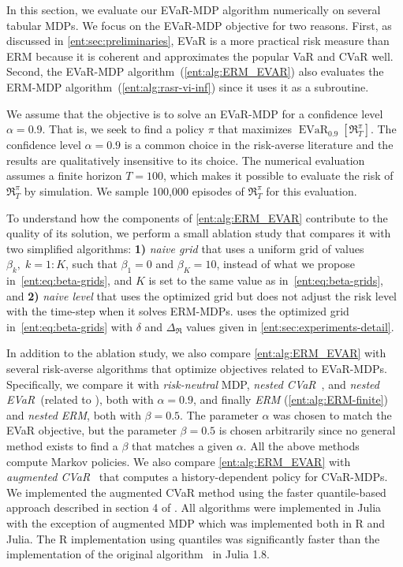 \documentclass[twoside]{article}
\newcommand{\vspan}{\Delta_{\mathfrak{R}}}
\newcommand{\evar}[2]{\operatorname{EVaR}_{#1} \left[#2\right]}
\theoremstyle{plain}
\theoremstyle{definition}
\theoremstyle{remark}
\renewcommand{\cite}[1]{\citep{#1}}
\begin{document}
In this section, we evaluate our EVaR-MDP algorithm numerically on several tabular MDPs. We focus on the EVaR-MDP objective for two reasons. First, as discussed in \cref{ent:sec:preliminaries}, EVaR is a more practical risk measure than ERM because it is coherent and approximates the popular VaR and CVaR well. Second, the EVaR-MDP algorithm~(\cref{ent:alg:ERM_EVAR}) also evaluates the ERM-MDP algorithm~(\cref{ent:alg:rasr-vi-inf}) since it uses it as a subroutine. 

We assume that the objective is to solve an EVaR-MDP for a confidence level $\alpha=0.9$. That is, we seek to find a policy $\pi$ that maximizes $\evar{0.9}{\mathfrak{R}_{T}^{\pi}}$. The confidence level $\alpha=0.9$ is a common choice in the risk-averse literature and the results are qualitatively insensitive to its choice. The numerical evaluation assumes a finite horizon $T=100$, which makes it possible to evaluate the risk of $\mathfrak{R}^{\pi}_T$ by simulation. We sample 100,000 episodes of $\mathfrak{R}^{\pi}_T$ for this evaluation.

To understand how the components of \cref{ent:alg:ERM_EVAR} contribute to the quality of its solution, we perform a small ablation study that compares it with two simplified algorithms: {\bf 1)} \emph{naive grid} that uses a uniform grid of values $\beta_k,\;k = 1{:}K$, such that $\beta_1 = 0$ and $\beta_K = 10$, instead of what we propose in~\eqref{ent:eq:beta-grids}, and $K$ is set to the same value as in~\eqref{ent:eq:beta-grids}, and {\bf 2)} \emph{naive level} that uses the optimized grid but does not adjust the risk level with the time-step when it solves ERM-MDPs.  uses the optimized grid in~\eqref{ent:eq:beta-grids} with $\delta$ and $\vspan$ values given in \cref{ent:sec:experiments-detail}.

In addition to the ablation study, we also compare \cref{ent:alg:ERM_EVAR} with several risk-averse algorithms that optimize objectives related to EVaR-MDPs. Specifically, we compare it with \emph{risk-neutral} MDP, \emph{nested CVaR}~\cite{Bauerle2022}, and \emph{nested EVaR}~(related to \citealt{Ahmadi2021b}), both with $\alpha=0.9$, and finally \emph{ERM} (\cref{ent:alg:ERM-finite}) and \emph{nested ERM}, both with $\beta=0.5$. The parameter $\alpha$ was chosen to match the EVaR objective, but the parameter $\beta=0.5$ is chosen arbitrarily since no general method exists to find a $\beta$ that matches a given $\alpha$. All the above methods compute Markov policies. We also compare \cref{ent:alg:ERM_EVAR} with \emph{augmented CVaR}~\cite{Chow2015} that computes a history-dependent policy for CVaR-MDPs. We implemented the augmented CVaR method using the faster quantile-based approach described in section 4 of \citet{Li2022}. All algorithms were implemented in Julia with the exception of augmented MDP which was implemented both in R and Julia. The R implementation using quantiles was significantly faster than the implementation of the original algorithm~\cite{Chow2015} in Julia 1.8. 
\end{document}
